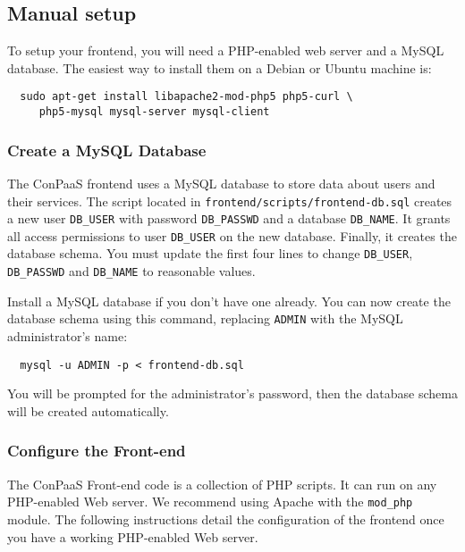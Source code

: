 \documentclass[10pt]{article}
\begin{document}
\subsection{Manual setup}
\label{sec:frontend-manual}
To setup your frontend, you will need a PHP-enabled web server and a
MySQL database. The easiest way to install them on a Debian or Ubuntu
machine is:

\begin{verbatim}
  sudo apt-get install libapache2-mod-php5 php5-curl \
     php5-mysql mysql-server mysql-client
\end{verbatim}

\subsubsection{Create a MySQL Database}

The ConPaaS frontend uses a MySQL database to store data about users
and their services. The script located in
\verb+frontend/scripts/frontend-db.sql+ creates a new user
\verb+DB_USER+ with password \verb+DB_PASSWD+ and a database
\verb+DB_NAME+. It grants all access permissions to user
\verb+DB_USER+ on the new database. Finally, it creates the database
schema. You must update the first four lines to change \verb+DB_USER+,
\verb+DB_PASSWD+ and \verb+DB_NAME+ to reasonable values.

Install a MySQL database if you don't have one already. You can now
create the database schema using this command, replacing \verb+ADMIN+
with the MySQL administrator's name:

\begin{verbatim}
  mysql -u ADMIN -p < frontend-db.sql
\end{verbatim}

You will be prompted for the administrator's password, then the
database schema will be created automatically.

\subsubsection{Configure the Front-end}

The ConPaaS Front-end code is a collection of PHP scripts. It can run
on any PHP-enabled Web server. We recommend using Apache with the
\verb+mod_php+ module. The following instructions detail the
configuration of the frontend once you have a working PHP-enabled Web
server.
\end{document}
